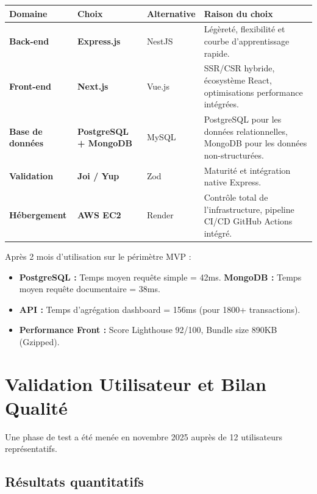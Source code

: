 \begin{center}
\small
\begin{tabular}{|p{}|p{}|p{}|p{}|}
\hline
\textbf{Domaine} & \textbf{Choix} & \textbf{Alternative} & \textbf{Raison du choix} \\
\hline
\textbf{Back-end} & \textbf{Express.js} & NestJS & Légèreté, flexibilité et courbe d'apprentissage rapide. \\
\hline
\textbf{Front-end} & \textbf{Next.js} & Vue.js & SSR/CSR hybride, écosystème React, optimisations performance intégrées. \\
\hline
\textbf{Base de données} & \textbf{PostgreSQL + MongoDB} & MySQL & PostgreSQL pour les données relationnelles, MongoDB pour les données non-structurées. \\
\hline
\textbf{Validation} & \textbf{Joi / Yup} & Zod & Maturité et intégration native Express. \\
\hline
\textbf{Hébergement} & \textbf{AWS EC2} & Render & Contrôle total de l'infrastructure, pipeline CI/CD GitHub Actions intégré. \\
\hline
\end{tabular}
\end{center}

\begin{tcolorbox}[colback=green!5!white,colframe=green!60!black,title=\textbf{Validation technique -- Métriques de production}]
Après 2 mois d'utilisation sur le périmètre MVP :
\begin{itemize}
    \item \textbf{PostgreSQL :} Temps moyen requête simple = 42ms. \textbf{MongoDB :} Temps moyen requête documentaire = 38ms.
    \item \textbf{API :} Temps d'agrégation dashboard = 156ms (pour 1800+ transactions).
    \item \textbf{Performance Front :} Score Lighthouse 92/100, Bundle size 890KB (Gzipped).
\end{itemize}
\end{tcolorbox}

\section{Validation Utilisateur et Bilan Qualité}

Une phase de test a été menée en novembre 2025 auprès de 12 utilisateurs représentatifs.

\subsection{Résultats quantitatifs}

